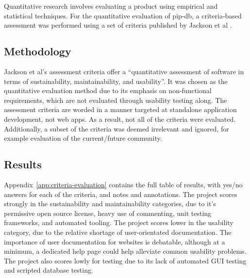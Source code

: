 Quantitative research involves evaluating a product using empirical
and statistical techniques. For the quantitative evaluation of pip-db,
a criteria-based assessment was performed using a set of criteria
published by Jackson et al \cite{jackson2011evaluation}.


\subsection{Methodology}

Jackson et al's assessment criteria offer a ``quantitative assessment
of software in terms of sustainability, maintainability, and
usability''. It was chosen as the quantitative evaluation method due
to its emphasis on non-functional requirements, which are not
evaluated through usability testing along. The assessment criteria are
worded in a manner targeted at standalone application development, not
web apps. As a result, not all of the criteria were
evaluated. Additionally, a subset of the criteria was deemed
irrelevant and ignored, for example evaluation of the current/future
community.

\subsection{Results}

Appendix~\ref{app:criteria-evaluation} contains the full table of
results, with yes/no answers for each of the criteria, and notes and
annotations. The project scores strongly in the sustainability and
maintainability categories, due to it's permissive open source
license, heavy use of commenting, unit testing frameworks, and
automated tooling. The project scores lower in the usability category,
due to the relative shortage of user-orientated documentation. The
importance of user documentation for websites is debatable, although
at a minimum, a dedicated help page could help alleviate common
usability problems. The project also scores lowly for testing due to
its lack of automated GUI testing and scripted database testing.

